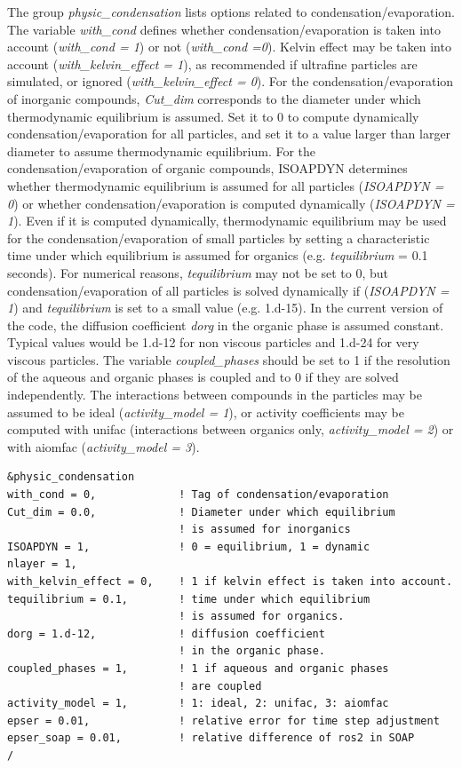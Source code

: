\documentclass[a4paper,11pt]{article}
\begin{document}
The group {\textit{physic\_condensation}} lists options related to condensation/evaporation. The variable {\textit{with\_cond}} defines whether condensation/evaporation is taken into account ({\textit{with\_cond = 1}}) or not ({\textit{with\_cond =0}}). Kelvin effect may be taken into account ({\textit{with\_kelvin\_effect = 1}}), as recommended if ultrafine particles are simulated, or ignored ({\textit{with\_kelvin\_effect = 0}}).
For the condensation/evaporation of inorganic compounds, {\textit{Cut\_dim}} corresponds to the diameter under which thermodynamic equilibrium is assumed. Set it to 0 to compute dynamically condensation/evaporation for all particles, and set it to a value larger than larger diameter to assume thermodynamic equilibrium.
For the condensation/evaporation of organic compounds, ISOAPDYN determines whether thermodynamic equilibrium is assumed for all particles ({\textit{ISOAPDYN = 0}}) or whether condensation/evaporation is computed dynamically ({\textit{ISOAPDYN = 1}}). Even if it is computed dynamically, thermodynamic equilibrium may be used for the condensation/evaporation of small particles by setting a characteristic time under which equilibrium is assumed for organics (e.g. {\textit{tequilibrium}} = 0.1 seconds). For numerical reasons, {\textit{tequilibrium}} may not be set to 0, but condensation/evaporation of all particles is solved dynamically if ({\textit{ISOAPDYN = 1}}) and {\textit{tequilibrium}} is set to a small value (e.g. 1.d-15). In the current version of the code, the diffusion coefficient {\textit{dorg}} in the organic phase is assumed constant. Typical values would be 1.d-12 for non viscous particles and 1.d-24 for very viscous particles. 
The variable {\textit{coupled\_phases}} should be set to 1 if the resolution of the aqueous and organic phases is coupled and to 0 if they are solved independently. The interactions between compounds in the particles may be assumed to be ideal ({\textit{activity\_model = 1}}), or activity coefficients may be computed with unifac (interactions between organics only, {\textit{activity\_model = 2}}) or with aiomfac ({\textit{activity\_model = 3}}).

\begin{verbatim}
&physic_condensation
with_cond = 0,             ! Tag of condensation/evaporation
Cut_dim = 0.0,             ! Diameter under which equilibrium
                           ! is assumed for inorganics
ISOAPDYN = 1,              ! 0 = equilibrium, 1 = dynamic
nlayer = 1,
with_kelvin_effect = 0,    ! 1 if kelvin effect is taken into account.
tequilibrium = 0.1,        ! time under which equilibrium 
                           ! is assumed for organics.
dorg = 1.d-12,             ! diffusion coefficient 
                           ! in the organic phase.
coupled_phases = 1,        ! 1 if aqueous and organic phases 
                           ! are coupled
activity_model = 1,        ! 1: ideal, 2: unifac, 3: aiomfac
epser = 0.01,              ! relative error for time step adjustment
epser_soap = 0.01,         ! relative difference of ros2 in SOAP  
/

\end{verbatim}
\end{document}

